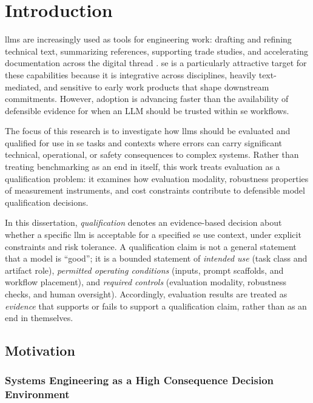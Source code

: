 \chapter{Introduction}\label{ch:introduction}

\acp{llm} are increasingly used as tools for engineering work: drafting and refining technical text, summarizing references, supporting trade studies, and accelerating documentation across the digital thread \cite{deputyassistantsecretaryofdefense_DepartmentDefenseDigitalStrategy_2018, dod_digital_modernization_strategy_2019}. \ac{se} is a particularly attractive target for these capabilities because it is integrative across disciplines, heavily text-mediated, and sensitive to early work products that shape downstream commitments. However, adoption is advancing faster than the availability of defensible evidence for when an LLM should be trusted within \ac{se} workflows.

The focus of this research is to investigate how \acp{llm} should be evaluated and qualified for use in \ac{se} tasks and contexts where errors can carry significant technical, operational, or safety consequences to complex systems. Rather than treating benchmarking as an end in itself, this work treats evaluation as a qualification problem: it examines how evaluation modality, robustness properties of measurement instruments, and cost constraints contribute to defensible model qualification decisions.

In this dissertation, \emph{qualification} denotes an evidence-based decision about whether a specific \ac{llm} is acceptable for a specified \ac{se} use context, under explicit constraints and risk tolerance. A qualification claim is not a general statement that a model is ``good''; it is a bounded statement of \emph{intended use} (task class and artifact role), \emph{permitted operating conditions} (inputs, prompt scaffolds, and workflow placement), and \emph{required controls} (evaluation modality, robustness checks, and human oversight). Accordingly, evaluation results are treated as \emph{evidence} that supports or fails to support a qualification claim, rather than as an end in themselves.

\section{Motivation}\label{sec:motivation}

\subsection{Systems Engineering as a High Consequence Decision Environment}\label{subsec:motivation_se_high_consequence}

